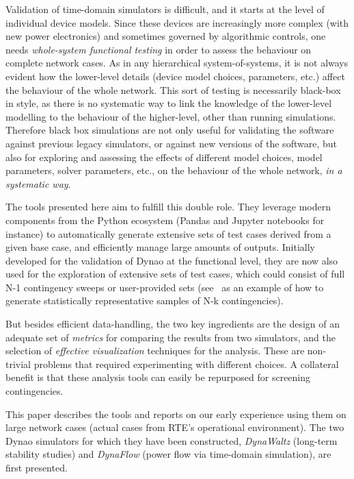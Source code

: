 \documentclass[conference]{IEEEtran}
\newcommand{\Dynawo}{Dyna\textomega o} %
\begin{document}
Validation of time-domain simulators is difficult, and it starts at the level of
individual device models. Since these devices are increasingly more complex
(with new power electronics) and sometimes governed by algorithmic controls, one
needs \emph{whole-system functional testing} in order to assess the behaviour on
complete network cases. As in any hierarchical system-of-systems, it is not
always evident how the lower-level details (device model choices, parameters,
etc.)  affect the behaviour of the whole network. This sort of testing is
necessarily black-box in style, as there is no systematic way to link the
knowledge of the lower-level modelling to the behaviour of the higher-level,
other than running simulations.  Therefore black box simulations are not only
useful for validating the software against previous legacy simulators, or
against new versions of the software, but also for exploring and assessing the
effects of different model choices, model parameters, solver parameters, etc.,
on the behaviour of the whole network, \emph{in a systematic way}.

The tools presented here aim to fulfill this double role. They leverage modern
components from the Python ecosystem (Pandas and Jupyter notebooks for instance)
to automatically generate extensive sets of test cases derived from a given base
case, and efficiently manage large amounts of outputs. Initially developed for
the validation of \Dynawo{} at the functional level, they are now also used for
the exploration of extensive sets of test cases, which could consist of full N-1
contingency sweeps or user-provided sets (see~\cite{Bogodorova20} as an example
of how to generate statistically representative samples of N-k contingencies).

But besides efficient data-handling, the two key ingredients are the design of
an adequate set of \emph{metrics} for comparing the results from two simulators,
and the selection of \emph{effective visualization} techniques for the analysis.
These are non-trivial problems that required experimenting with different
choices. A collateral benefit is that these analysis tools can easily be
repurposed for screening contingencies.

This paper describes the tools and reports on our early experience using them on
large network cases (actual cases from RTE's operational environment). The two
\Dynawo{} simulators for which they have been constructed, \emph{DynaWaltz}
(long-term stability studies) and \emph{DynaFlow} (power flow via time-domain
simulation), are first presented.
\end{document}
